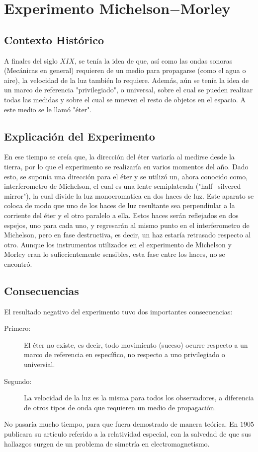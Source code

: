 \section{Experimento Michelson$-$Morley}

\subsection{Contexto Histórico}

A finales del siglo $XIX$, se tenía la idea de que, así como las ondas sonoras (Mecánicas en general) requieren de un medio para propagarse (como el agua o aire), la velocidad de la luz también lo requiere. Además, aún se tenía la idea de un marco de referencia "privilegiado", o universal, sobre el cual se pueden realizar todas las medidas y sobre el cual se mueven el resto de objetos en el espacio. A este medio se le llamó "éter".

\subsection{Explicación del Experimento}

En ese tiempo se creía que, la dirección del éter variaría al medirse desde la tierra, por lo que el experimento se realizaría en varios momentos del año. Dado esto, se suponía una dirección para el éter y se utilizó un, ahora conocido como, interferometro de Michelson, el cual es una lente semiplateada ("half$-$silvered mirror"), la cual divide la luz monocromatica en dos haces de luz. Este aparato se coloca de modo que uno de los haces de luz resultante sea perpendiular a la corriente del éter y el otro paralelo a ella. Estos haces serán reflejados en dos espejos, uno para cada uno, y regresarán al mismo punto en el interferometro de Michelson, pero en fase destructiva, es decir, un haz estaría retrasado respecto al otro. Aunque los instrumentos utilizados en el experimento de Michelson y Morley eran lo sufiecientemente sensibles, esta fase entre los haces, no se encontró.

\subsection{Consecuencias}

El resultado negativo del experimento tuvo dos importantes consecuencias:
	\begin{description}
		\item[Primero: ] El éter no existe, es decir, todo movimiento (suceso) ocurre  respecto a un marco de referencia en específico, no respecto a uno privilegiado o universial.
		\item[Segundo: ] La velocidad de la luz es la misma para todos los observadores, a diferencia de otros tipos de onda que requieren un medio de propagación.
	\end{description}
No pasaría mucho tiempo, para que fuera demostrado de manera teórica. En $1905$ publicara su artículo referido a la relatividad especial, con la salvedad de que sus hallazgos surgen de un problema de simetría en electromagnetismo.